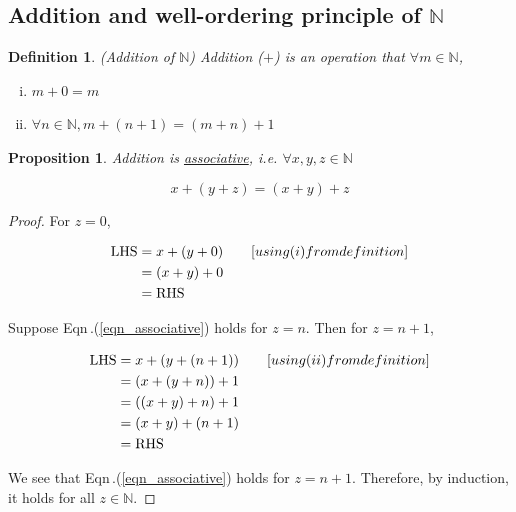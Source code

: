 \documentclass{article}
\newtheorem{proposition}{Proposition}
\newtheorem{definition}{Definition}
\begin{document}
\subsection{Addition and well-ordering principle of $\mathbb{N}$}

\begin{definition}
  (Addition of $\mathbb{N}$) Addition ($+$) is an operation that $\forall m\in \mathbb{N}$,
  
  \begin{enumerate}[i.]
    \item $m + 0 = m$
    \item $\forall n\in \mathbb{N}, m + (n + 1) = (m + n) + 1$
  \end{enumerate}
\end{definition}

\begin{proposition}
  Addition is \underline{associative}, i.e. $\forall x, y, z \in\mathbb{N}$
  
  \begin{equation}
    \label{eqn_associative}
    x + (y + z) = (x + y) + z
  \end{equation}
\end{proposition}

\begin{proof}
  For $z = 0$,

  \begin{equation*}
    \begin{split}
      \textnormal{LHS} &= x + (y + 0)\quad\quad[using (i) from definition]\\
      &= (x+y) + 0\\
      &= \textnormal{RHS}\\
    \end{split}
  \end{equation*}

  Suppose Eqn\,.(\ref{eqn_associative}) holds for $z = n$. Then for $z = n+1$,

  \begin{equation*}
    \begin{split}
      \textnormal{LHS} &= x + (y + (n + 1))\quad\quad[using (ii) from definition]\\
      &= (x + (y + n)) + 1\\
      &= ((x + y) + n) + 1\\
      &= (x + y) + (n + 1)\\
      &= \textnormal{RHS}\\
    \end{split}
  \end{equation*}

  We see that Eqn\,.(\ref{eqn_associative}) holds for $z=n+1$. Therefore, by induction, it holds for all $z\in\mathbb{N}$.
\end{proof}
\end{document}
